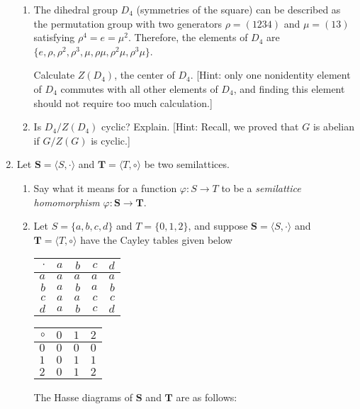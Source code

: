 \documentclass[fleqn,12pt]{article}
\newcommand{\<}{\ensuremath{\langle}}
\renewcommand{\>}{\ensuremath{\rangle}}
\newcommand{\bS}{\ensuremath{\mathbf{S}}}
\newcommand{\bT}{\ensuremath{\mathbf{T}}}
\begin{document}
\begin{enumerate}[{\bf 1.}]
\begin{enumerate}
\item
The dihedral group $D_4$ (symmetries of the square) can be
described as the permutation group with two generators 
$\rho = (1234)$ and $\mu = (13)$ satisfying $\rho^4= e = \mu^2$.
Therefore, the elements of $D_4$ are 
$\{e, \rho, \rho^2, \rho^3, \mu, \rho \mu, \rho^2 \mu, \rho^3 \mu\}$.

Calculate $Z(D_4)$, the center of $D_4$. [Hint: only one nonidentity
element of $D_4$ commutes with all other elements of $D_4$, and finding
this element should not require too much calculation.]
 
 \vskip7cm

 
 \item
Is $D_4/Z(D_4)$ cyclic?  Explain. [Hint: Recall, we proved that 
$G$ is abelian if $G/Z(G)$ is cyclic.]
\end{enumerate}
\newpage

\item Let $\bS = \<S, \cdot\>$ and $\bT = \<T, \circ\>$ be two semilattices.
  \begin{enumerate}
  \item Say what it means for a function $\varphi: S \rightarrow T$ to be a
    \emph{semilattice homomorphism} $\varphi: \bS \rightarrow \bT$.
\vskip3cm
\item Let $S = \{a, b, c, d\}$ and $T = \{0, 1, 2\}$, and suppose 
  $\bS = \<S, \cdot\>$ and
  $\bT= \<T, \circ\>$ have the Cayley tables given below

\medskip
\begin{center}
\begin{tabular}{r|rrrr}
  $\cdot$ & $a$ &$b$&$c$&$d $\\
\hline
  $a$ & $a$ &$a$&$a$&$a$\\
  $b$ & $a$ &$b$&$a$&$b$\\
  $c$ & $a$ &$a$&$c$&$c$\\
  $d$ & $a$ &$b$&$c$&$d$
\end{tabular}
\hskip2cm
\begin{tabular}{r|rrr}
  $\circ$ & $0$ &$1$&$2$\\
\hline
  $0$ & $0$ &$0$&$0$\\
  $1$ & $0$ &$1$&$1$\\
  $2$ & $0$ &$1$&$2$
\end{tabular}
\end{center}

\medskip
The Hasse diagrams of $\bS$ and $\bT$ are as follows:
\begin{center}
  

\end{center}
\end{enumerate}
\end{enumerate}
\end{document}
